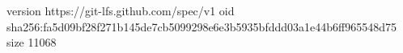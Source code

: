 version https://git-lfs.github.com/spec/v1
oid sha256:fa5d09bf28f271b145de7cb5099298e6e3b5935bfddd03a1e44b6ff965548d75
size 11068
